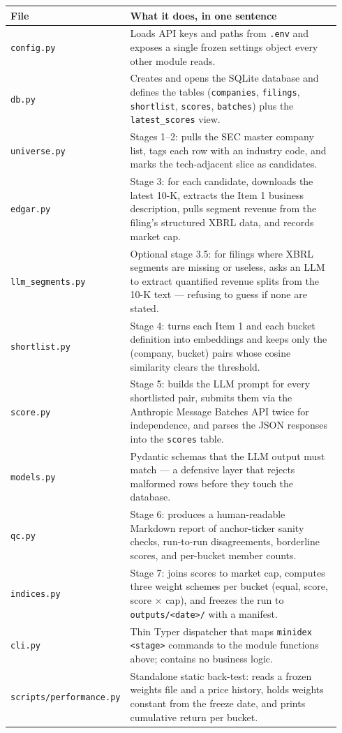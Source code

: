 \documentclass[11pt,a4paper,oneside]{article}
\begin{document}
\begin{center}
\begin{tabular}{@{}p{0.28\linewidth} p{0.66\linewidth}@{}}
\toprule
\textbf{File} & \textbf{What it does, in one sentence} \\
\midrule
\texttt{config.py} & Loads API keys and paths from \texttt{.env} and exposes a single frozen settings object every other module reads. \\
\texttt{db.py} & Creates and opens the SQLite database and defines the tables (\texttt{companies}, \texttt{filings}, \texttt{shortlist}, \texttt{scores}, \texttt{batches}) plus the \texttt{latest\_scores} view. \\
\texttt{universe.py} & Stages 1--2: pulls the SEC master company list, tags each row with an industry code, and marks the tech-adjacent slice as candidates. \\
\texttt{edgar.py} & Stage 3: for each candidate, downloads the latest 10-K, extracts the Item 1 business description, pulls segment revenue from the filing's structured XBRL data, and records market cap. \\
\texttt{llm\_segments.py} & Optional stage 3.5: for filings where XBRL segments are missing or useless, asks an LLM to extract quantified revenue splits from the 10-K text --- refusing to guess if none are stated. \\
\texttt{shortlist.py} & Stage 4: turns each Item 1 and each bucket definition into embeddings and keeps only the (company, bucket) pairs whose cosine similarity clears the threshold. \\
\texttt{score.py} & Stage 5: builds the LLM prompt for every shortlisted pair, submits them via the Anthropic Message Batches API twice for independence, and parses the JSON responses into the \texttt{scores} table. \\
\texttt{models.py} & Pydantic schemas that the LLM output must match --- a defensive layer that rejects malformed rows before they touch the database. \\
\texttt{qc.py} & Stage 6: produces a human-readable Markdown report of anchor-ticker sanity checks, run-to-run disagreements, borderline scores, and per-bucket member counts. \\
\texttt{indices.py} & Stage 7: joins scores to market cap, computes three weight schemes per bucket (equal, score, score \(\times\) cap), and freezes the run to \texttt{outputs/<date>/} with a manifest. \\
\texttt{cli.py} & Thin Typer dispatcher that maps \texttt{minidex <stage>} commands to the module functions above; contains no business logic. \\
\texttt{scripts/performance.py} & Standalone static back-test: reads a frozen weights file and a price history, holds weights constant from the freeze date, and prints cumulative return per bucket. \\
\bottomrule
\end{tabular}
\end{center}
\end{document}
